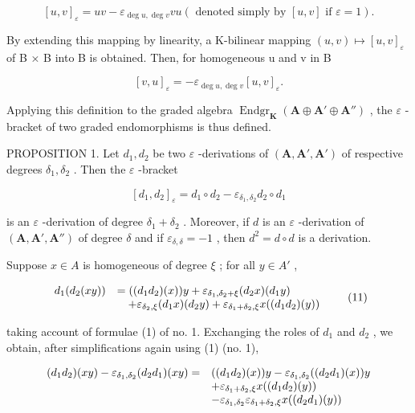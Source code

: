 \[
[ u, v ] _ {\varepsilon} = u v - \varepsilon_ {\deg u, \deg v} v u (\text { denoted   simply   by } [ u, v ] \text { if } \varepsilon = 1).
\]

By extending this mapping by linearity, a K-bilinear mapping \((u, v) \mapsto [u, v]_{\varepsilon}\) of B × B into B is obtained. Then, for homogeneous u and v in B

\[
[ v, u ] _ {\varepsilon} = - \varepsilon_ {\deg u, \deg v} [ u, v ] _ {\varepsilon}.
\]

Applying this definition to the graded algebra \(\operatorname{Endgr}_{\mathbf{K}}(\mathbf{A} \oplus \mathbf{A}' \oplus \mathbf{A}'')\) , the \(\varepsilon\) -bracket of two graded endomorphisms is thus defined.

PROPOSITION 1. Let \(d_1, d_2\) be two \(\varepsilon\) -derivations of \((\mathbf{A}, \mathbf{A}', \mathbf{A} ' )\) of respective degrees \(\delta_1, \delta_2\) . Then the \(\varepsilon\) -bracket

\[
[ d _ {1}, d _ {2} ] _ {\varepsilon} = d _ {1} \circ d _ {2} - \varepsilon_ {\delta_ {1}, \delta_ {2}} d _ {2} \circ d _ {1}
\]

is an \(\varepsilon\) -derivation of degree \(\delta_1 + \delta_2\) . Moreover, if \(d\) is an \(\varepsilon\) -derivation of \((\mathbf{A}, \mathbf{A}', \mathbf{A}'')\) of degree \(\delta\) and if \(\varepsilon_{\delta, \delta} = -1\) , then \(d^2 = d \circ d\) is a derivation.

Suppose \(x \in A\) is homogeneous of degree \(\xi\) ; for all \(y \in A'\) ,

\[
\begin{array}{r l} d _ {1} (d _ {2} (x y)) & = ((d _ {1} d _ {2}) (x)) y + \varepsilon_ {\delta_ {1}, \delta_ {2} + \xi} (d _ {2} x) (d _ {1} y) \\ & \quad + \varepsilon_ {\delta_ {2}, \xi} (d _ {1} x) (d _ {2} y) + \varepsilon_ {\delta_ {1} + \delta_ {2}, \xi} x ((d _ {1} d _ {2}) (y)) \end{array}\tag{11}
\]

taking account of formulae (1) of no. 1. Exchanging the roles of \(d_1\) and \(d_2\) , we obtain, after simplifications again using (1) (no. 1),

\[
\begin{array}{r l} (d _ {1} d _ {2}) (x y) - \varepsilon_ {\delta_ {1}, \delta_ {2}} (d _ {2} d _ {1}) (x y) = & ((d _ {1} d _ {2}) (x)) y - \varepsilon_ {\delta_ {1}, \delta_ {2}} ((d _ {2} d _ {1}) (x)) y \\ & + \varepsilon_ {\delta_ {1} + \delta_ {2}, \xi} x ((d _ {1} d _ {2}) (y)) \\ & - \varepsilon_ {\delta_ {1}, \delta_ {2}} \varepsilon_ {\delta_ {1} + \delta_ {2}, \xi} x ((d _ {2} d _ {1}) (y)) \end{array}
\]

